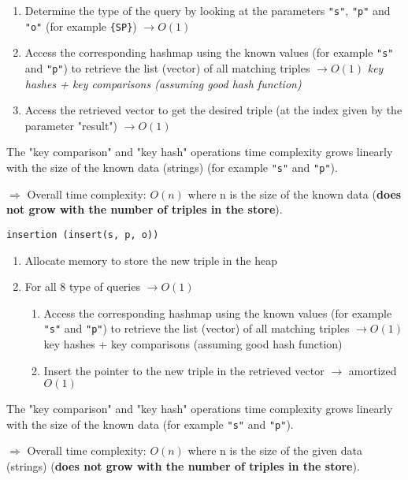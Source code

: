 \begin{enumerate}
    \item
    Determine the type of the query by looking at the parameters \verb!"s"!, \verb!"p"! and \verb!"o"! (for example \verb!{SP}!) $\rightarrow O(1)$
    \item
    Access the corresponding hashmap using the known values (for example \verb!"s"! and \verb!"p"!) to retrieve the list (vector) of all matching triples $\rightarrow O(1)$ \emph{key hashes + key comparisons (assuming good hash function)}
    \item
    Access the retrieved vector to get the desired triple (at the index given by the parameter "result") $\rightarrow O(1)$
\end{enumerate}

The "key comparison" and "key hash" operations time complexity grows linearly with the size of the known data (strings) (for example \verb!"s"! and \verb!"p"!).

$\Rightarrow$ Overall time complexity: $O(n)$ where n is the size of the known data (\textbf{does not grow with the number of triples in the store}).

\bigskip
\begin{tcolorbox}
\verb!insertion (insert(s, p, o))!
\end{tcolorbox}

\begin{enumerate}
    \item
    Allocate memory to store the new triple in the heap
    \item
    For all 8 type of queries $\rightarrow O(1)$
    \begin{enumerate}
        \item
        Access the corresponding hashmap using the known values (for example \verb!"s"! and \verb!"p"!) to retrieve the list (vector) of all matching triples $\rightarrow O(1)$ key hashes + key comparisons (assuming good hash function)
        \item
        Insert the pointer to the new triple in the retrieved vector $\rightarrow$ amortized $O(1)$
    \end{enumerate}
\end{enumerate}

The "key comparison" and "key hash" operations time complexity grows linearly with the size of the known data (for example \verb!"s"! and \verb!"p"!).

$\Rightarrow$ Overall time complexity: $O(n)$ where n is the size of the given data (strings) (\textbf{does not grow with the number of triples in the store}).



